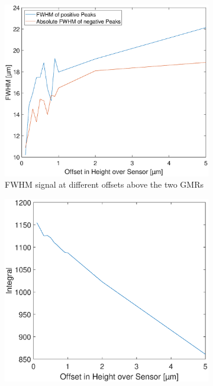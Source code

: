 \begin{figure}[htb!]
	\begin{subfigure}[l]{0.49\linewidth} 
		\centering
		\includegraphics[clip,trim={0mm 0mm 0mm 0mm}, width=\linewidth]{Ressourcen/Results/OffZ/Offset_FWHM}
		\caption{FWHM signal at different offsets above the two GMRs}
		\label{fig:sim:off:z:FWHM}
	\end{subfigure}
	\hfil
	\begin{subfigure}[r]{0.49\linewidth} 
		\centering
		\includegraphics[clip,trim={0mm 0mm 0mm 0mm}, width=\linewidth]{Ressourcen/Results/OffZ/Offset_Int}

\end{subfigure}
\end{figure}
